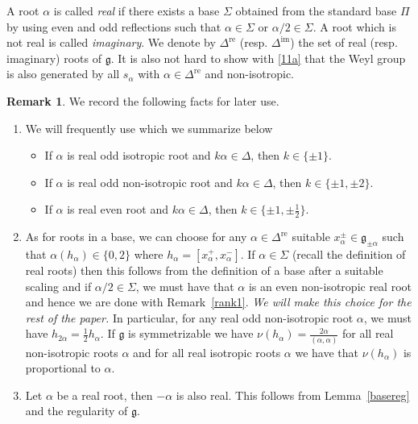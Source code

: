 \documentclass[11pt,reqno]{amsart}
\theoremstyle{plain}
\theoremstyle{definition}
\newtheorem*{rem}{Remark}
\theoremstyle{remark}
\newcommand{\lie}[1]{\mathfrak{#1}}
\numberwithin{equation}{section}
\begin{document}
 A root $\alpha$ is called \textit{real} if there exists a base $\Sigma$ obtained from the standard base $\Pi$ by using even and odd reflections such that $\alpha\in \Sigma$ or $\alpha/2\in\Sigma.$ A root which is not real is called \textit{imaginary}. We denote by $\Delta^{\mathrm{re}}$ (resp. $\Delta^{\mathrm{im}}$) the set of real (resp. imaginary) roots of $\lie g.$  It is also not hard to show with \eqref{11a} that the Weyl group is also generated by all $s_{\alpha}$ with $\alpha\in \Delta^{\mathrm{re}}$ and non-isotropic. 
 \begin{rem}\label{triple}We record the following facts for later use.
\begin{enumerate}
\item We will frequently use \cite[Lemma 4.11]{Serganova11KacMoody} which we summarize below
\begin{itemize}
    \item If $\alpha$ is real odd isotropic root and $k\alpha\in\Delta$, then $k\in\{\pm 1\}$.
    \item If $\alpha$ is real odd non-isotropic root and $k\alpha\in\Delta$, then $k\in\{\pm 1, \pm 2\}$.
    \item If $\alpha$ is real even root and $k\alpha\in\Delta$, then $k\in\{\pm 1, \pm \frac{1}{2}\}$.
\end{itemize}
    \item As for roots in a base, we can choose for any $\alpha\in \Delta^{\mathrm{re}}$ suitable $x_{\alpha}^{\pm}\in \lie g_{\pm \alpha}$ such that $\alpha(h_{\alpha})\in\{0,2\}$ where $h_{\alpha}=[x_{\alpha}^{+},x_{\alpha}^{-}]$. If $\alpha\in \Sigma$ (recall the definition of real roots) then this follows from the definition of a base after a suitable scaling and if $\alpha/2\in\Sigma$, we must have that $\alpha$ is an even non-isotropic real root and hence we are done with Remark~\ref{rank1}. \textit{We will make this choice for the rest of the paper.} In particular, for any real odd non-isotropic root $\alpha$, we must have $h_{2\alpha}=\frac{1}{2}h_\alpha$. If $\lie g$ is symmetrizable we have $\nu(h_{\alpha})=\frac{2\alpha}{(\alpha,\alpha)}$ for all real non-isotropic roots $\alpha$ and for all real isotropic roots $\alpha$ we have that $\nu(h_{\alpha})$ is proportional to $\alpha$.
    \item Let $\alpha$ be a real root, then $-\alpha$ is also real. This follows from Lemma~\ref{basereg} and the regularity of $\lie g$.
\end{enumerate}
 \end{rem}
\end{document}
